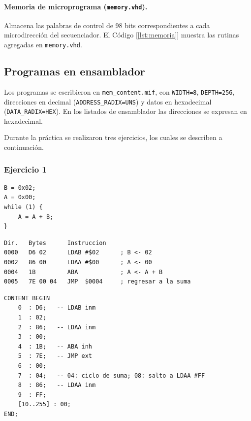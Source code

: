 \documentclass[letterpaper,12pt]{article}
\begin{document}
\paragraph{Memoria de microprograma (\texttt{memory.vhd}).} Almacena las palabras de control de 98 bits correspondientes a cada microdirección del secuenciador. El Código [\ref{lst:memoria}] muestra las rutinas agregadas en \texttt{memory.vhd}.

\newpage



\subsection{Programas en ensamblador}

Los programas se escribieron en \texttt{mem\_content.mif}, con \texttt{WIDTH=8}, \texttt{DEPTH=256}, direcciones en decimal (\texttt{ADDRESS\_RADIX=UNS}) y datos en hexadecimal (\texttt{DATA\_RADIX=HEX}). En los listados de ensamblador las direcciones se expresan en hexadecimal.

Durante la práctica se realizaron tres ejercicios, los cuales se describen a continuación.

\subsubsection{Ejercicio 1}

\begin{lstlisting}[style=pseudo]
B = 0x02;
A = 0x00;
while (1) {
    A = A + B;
}
\end{lstlisting}

\begin{lstlisting}[style=asm,caption={Ejercicio 1 en ensamblador.},label={lst:asm1}]
Dir.   Bytes      Instruccion
0000   D6 02      LDAB #$02      ; B <- 02
0002   86 00      LDAA #$00      ; A <- 00
0004   1B         ABA            ; A <- A + B
0005   7E 00 04   JMP  $0004     ; regresar a la suma
\end{lstlisting}

\begin{lstlisting}[style=mif,caption={Contenido de \texttt{mem\_content.mif} para el ejercicio 1.},label={lst:mif1}]
CONTENT BEGIN
    0  : D6;   -- LDAB inm
    1  : 02;
    2  : 86;   -- LDAA inm
    3  : 00;
    4  : 1B;   -- ABA inh
    5  : 7E;   -- JMP ext
    6  : 00;
    7  : 04;   -- 04: ciclo de suma; 08: salto a LDAA #FF
    8  : 86;   -- LDAA inm
    9  : FF;
    [10..255] : 00;
END;
\end{lstlisting}
\end{document}
